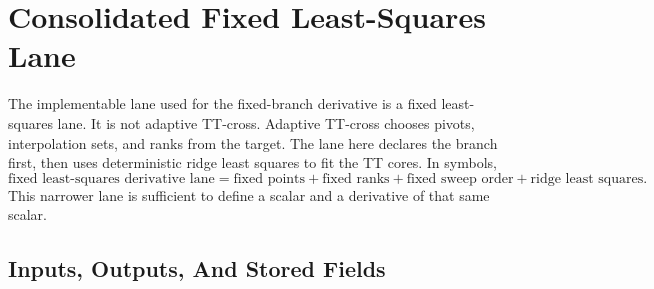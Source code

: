 \documentclass[11pt]{article}
\numberwithin{equation}{section}
\begin{document}
\section{Consolidated Fixed Least-Squares Lane}

The implementable lane used for the fixed-branch derivative is a fixed
least-squares lane.  It is not adaptive TT-cross.  Adaptive TT-cross chooses
pivots, interpolation sets, and ranks from the target.  The lane here declares
the branch first, then uses deterministic ridge least squares to fit the TT
cores.  In symbols,
\begin{equation}
    \text{fixed least-squares derivative lane}
    =
    \text{fixed points}
    +
    \text{fixed ranks}
    +
    \text{fixed sweep order}
    +
    \text{ridge least squares}.
    \label{eq:p25-ls-1}
\end{equation}
This narrower lane is sufficient to define a scalar and a derivative of that
same scalar.

\subsection{Inputs, Outputs, And Stored Fields}
\end{document}
